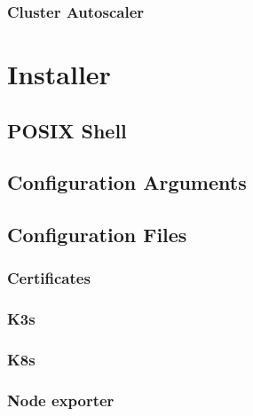 \subsubsection{Cluster Autoscaler}
\label{subsec:implementation_dependencies_autoscaler_cluster_autoscaler}

\section{Installer}
\label{sec:implementation_installer}

\subsection{POSIX Shell}
\label{subsec:implementation_installer_posix_shell}

\subsection{Configuration Arguments}
\label{subsec:implementation_installer_configuration_arguments}

\subsection{Configuration Files}
\label{subsec:implementation_installer_configuration_files}

\subsubsection{Certificates}
\label{subsubsec:implementation_installer_configuration_files_certificates}

\subsubsection{K3s}
\label{subsubsec:implementation_installer_configuration_files_k3s}

\subsubsection{K8s}
\label{subsubsec:implementation_installer_configuration_filesn_k8s}

\subsubsection{Node exporter}
\label{subsubsec:implementation_installer_configuration_files_node_exporter}

